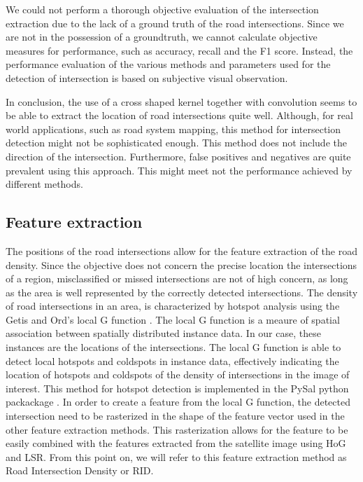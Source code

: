 We could not perform a thorough objective evaluation of the intersection extraction due to the lack of a ground truth of the road intersections. Since we are not in the possession of a groundtruth, we cannot calculate objective measures for performance, such as accuracy, recall and the F1 score. Instead, the performance evaluation of the various methods and parameters used for the detection of intersection is based on subjective visual observation.

In conclusion, the use of a cross shaped kernel together with convolution seems to be able to extract the location of road intersections quite well. Although, for real world applications, such as road system mapping, this method for intersection detection might not be sophisticated enough. This method does not include the direction of the intersection. Furthermore, false positives and negatives are quite prevalent using this approach. This might meet not the performance achieved by different methods.

\subsection{Feature extraction}

The positions of the road intersections allow for the
feature extraction of the road density. Since the objective does not concern the
precise location the intersections of a region, misclassified or missed intersections are not of high concern, as long as the area is well represented by the correctly detected intersections. The density of road intersections in an area, is characterized by hotspot analysis using the Getis and Ord's local G function \cite{getis1992analysis}. The local G function is a meaure of spatial association between spatially distributed instance data. In our case, these instances are the locations of the intersections. The local G function is able to detect local hotspots and coldspots in instance data, effectively indicating the location of hotspots and coldspots of the density of intersections in the image of interest. This method for hotspot detection is implemented in the PySal python packackage \cite{rey2010pysal}. In order to create a feature from the local G function, the detected intersection need to be rasterized in the shape of the feature vector used in the other feature extraction methods. This rasterization allows for the feature to be easily combined with the features extracted from the satellite image using HoG and LSR. From this point on, we will refer to this feature extraction method as Road Intersection Density or RID.




